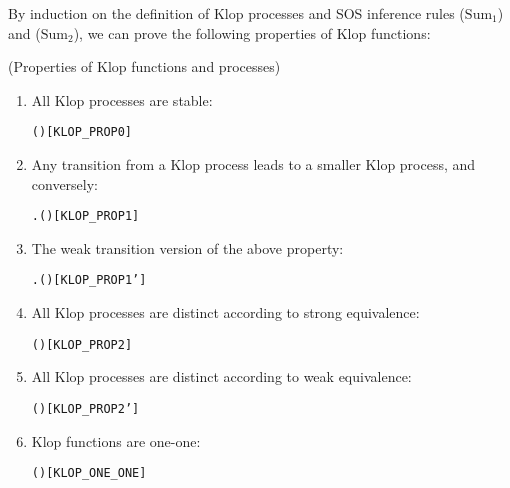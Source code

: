 By induction on the definition of Klop processes and SOS inference
rules ($\mathrm{Sum}_1$) and ($\mathrm{Sum}_2$), we can  prove
the following properties of Klop functions:
\begin{proposition}{(Properties of Klop functions and processes)}
\begin{enumerate}
\item All Klop processes are stable:
\begin{alltt}
\HOLTokenTurnstile{}  (  )\hfill[KLOP_PROP0]
\end{alltt}
\item Any transition from a Klop process leads to a smaller Klop
  process, and conversely:
\begin{alltt}
\HOLTokenTurnstile{}    \HOLTokenTransBegin{} \HOLTokenTransEnd {} \HOLSymConst{\HOLTokenEquiv{}} \HOLSymConst{\HOLTokenExists{}}.  \HOLSymConst{\HOLTokenLt{}}  \HOLSymConst{\HOLTokenConj{}} ( \HOLSymConst{=}   )\hfill{[KLOP_PROP1]}
\end{alltt}
\item The weak transition version of the above property:
\begin{alltt}
\HOLTokenTurnstile{}    \HOLTokenWeakTransBegin{} \HOLTokenWeakTransEnd {} \HOLSymConst{\HOLTokenEquiv{}} \HOLSymConst{\HOLTokenExists{}}.  \HOLSymConst{\HOLTokenLt{}}  \HOLSymConst{\HOLTokenConj{}} ( \HOLSymConst{=}   )\hfill{[KLOP_PROP1']}
\end{alltt}
\item All Klop processes are distinct according to strong equivalence:
\begin{alltt}
\HOLTokenTurnstile{}  \HOLSymConst{\HOLTokenLt{}}  \HOLSymConst{\HOLTokenImp{}} \HOLSymConst{\HOLTokenNeg{}}(   \HOLSymConst{\HOLTokenStrongEQ}   )\hfill{[KLOP_PROP2]}
\end{alltt}
\item All Klop processes are distinct according to weak equivalence:
\begin{alltt}
\HOLTokenTurnstile{}  \HOLSymConst{\HOLTokenLt{}}  \HOLSymConst{\HOLTokenImp{}} \HOLSymConst{\HOLTokenNeg{}}(   \HOLSymConst{\HOLTokenWeakEQ}   )\hfill{[KLOP_PROP2']}
\end{alltt}
\item Klop functions are one-one:
\begin{alltt}
\HOLTokenTurnstile{}  ( )\hfill{[KLOP_ONE_ONE]}
\end{alltt}
\end{enumerate}
\end{proposition}

